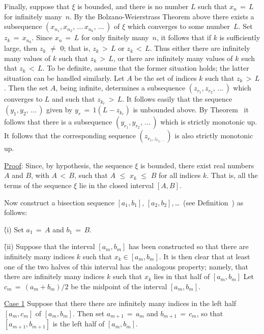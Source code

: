 {        Finally, suppose that ${\xi}$ is bounded, and there is no number $L$ such that $x_{n} \,=\, L$ for infinitely many~$n$.
    By the Bolzano-Weierstrass Theorem above there exists a subsequence $(x_{n_{1}}, x_{n_{2}},\,{\ldots}\,x_{n_{k}},\,{\ldots}\,)$
    of ${\xi}$ which converges to some number~$L$. Set $z_{k} \,=\, x_{n_{k}}$.
    Since $x_{n} \,=\, L$ for only finitely many~$n$, it follows that if $k$ is sufficiently large,
    then $z_{k} \,\,{\neq}\,\, 0$; that is, $z_{k}\,>\,L$ or $z_{k}\,<\,L$. Thus either there are infinitely many values of $k$ such that $z_{k}\,>\,L$,
    or there are infinitely many values of $k$ such that $z_{k}\,<\,L$. To be definite,
    assume that the former situation holds; the latter situation can be handled similarly.
    Let $A$ be the set of indices $k$ such that $z_{k}\,>\,L$. Then the set $A$, being infinite,
    determines a subsequence $(z_{r_{1}}, z_{r_{2}},\,{\ldots}\,)$ which converges to $L$ and such that $z_{k_{r}}\,>\,L$.
    It follows easily that the sequence $(y_{1}, y_{2},\,{\ldots}\,)$ given by $y_{r} \,=\, 1(L-z_{k_{r}})$ is unbounded above.
    By Theorem~ it follows that there is a subsequence $(y_{r_{1}}, y_{r_{2}},\,{\ldots}\,)$ which is strictly monotonic up.
    It follows that the corresponding sequence $(z_{r_{1}, z_{r_{2},\,{\ldots}\,}})$ is also strictly monotonic up.
    


        \underline{Proof}: Since, by hypothesis, the sequence ${\xi}$ is bounded,
    there exist real numbers $A$ and $B$, with $A\,<\,B$, such that $A\,\,{\leq}\,\,x_{k}\,\,{\leq}\,\,B$ for all indices $k$.
    That is, all the terms of the sequence ${\xi}$ lie in the closed interval $[A,B]$.

    Now construct a bisection sequence $[a_{1},b_{1}]$, $[a_{2},b_{2}]$,\,{\ldots}\,  (see Definition~) as follows:

        \h (i) Set $a_{1} \,=\, A$ and $b_{1} \,=\, B$.

        \h (ii) Suppose that the interval $[a_{m},b_{m}]$ has been constructed so that there are infinitely many indices $k$ such that $x_{k}{\in}[a_{m},b_{m}]$.
    It is then clear that at least one of the two halves of this interval has the analogous property;
    namely, that there are infinitely many indices $k$ such that $x_{k}$ lies in that half of $[a_{m},b_{m}]$
    Let $c_{m} \,=\, (a_{m}+b_{m})/2$ be the midpoint of the interval $[a_{m},b_{m}]$.

        \underline{Case 1} Suppose that there there are infinitely many indices in the left half $[a_{m},c_{m}]$ of $[a_{m},b_{m}]$.
    Then set $a_{m+1} \,=\, a_{m}$ and $b_{m+1} \,=\, c_{m}$, so that $[a_{m+1},b_{m+1}]$ is the left half of $[a_{m},b_{m}]$.

}
